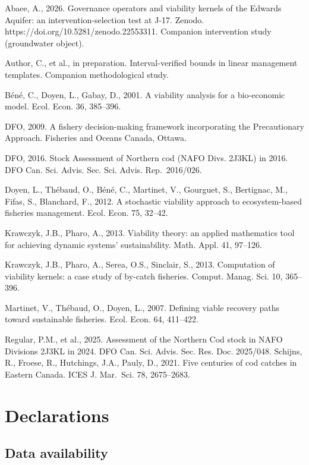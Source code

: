 \documentclass[11pt]{article}
\begin{document}
Abaee, A., 2026. Governance operators and viability kernels of the
Edwards Aquifer: an intervention-selection test at J-17. Zenodo.
https://doi.org/10.5281/zenodo.22553311. Companion intervention study
(groundwater object).

Author, C., et al., in preparation. Interval-verified bounds in linear
management templates. Companion methodological study.

B\'en\'e, C., Doyen, L., Gabay, D., 2001. A viability analysis for a
bio-economic model. Ecol. Econ. 36, 385--396.

DFO, 2009. A fishery decision-making framework incorporating the
Precautionary Approach. Fisheries and Oceans Canada, Ottawa.

DFO, 2016. Stock Assessment of Northern cod (NAFO Divs. 2J3KL) in 2016.
DFO Can. Sci. Advis. Sec. Sci. Advis. Rep.~2016/026.

Doyen, L., Th\'ebaud, O., B\'en\'e, C., Martinet, V., Gourguet, S., Bertignac,
M., Fifas, S., Blanchard, F., 2012. A stochastic viability approach to
ecosystem-based fisheries management. Ecol. Econ. 75, 32--42.

Krawczyk, J.B., Pharo, A., 2013. Viability theory: an applied
mathematics tool for achieving dynamic systems' sustainability. Math.
Appl. 41, 97--126.

Krawczyk, J.B., Pharo, A., Serea, O.S., Sinclair, S., 2013. Computation
of viability kernels: a case study of by-catch fisheries. Comput. Manag.
Sci. 10, 365--396.

Martinet, V., Th\'ebaud, O., Doyen, L., 2007. Defining viable recovery
paths toward sustainable fisheries. Ecol. Econ. 64, 411--422.

Regular, P.M., et al., 2025. Assessment of the Northern Cod stock in
NAFO Divisions 2J3KL in 2024. DFO Can. Sci. Advis. Sec. Res. Doc.
2025/048. Schijns, R., Froese, R., Hutchings, J.A., Pauly, D., 2021.
Five centuries of cod catches in Eastern Canada. ICES J. Mar.~Sci. 78,
2675--2683.

\section*{Declarations}

\subsection*{Data availability}
\end{document}
